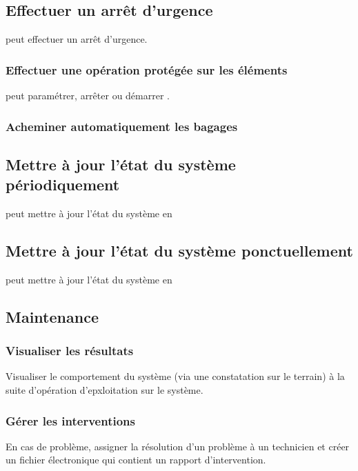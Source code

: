 \subsection{Effectuer un arrêt d'urgence}
 peut effectuer un arrêt d'urgence.

\subsubsection{Effectuer une opération protégée sur les éléments}
 peut paramétrer, arrêter ou démarrer .

\subsubsection{Acheminer automatiquement les bagages}

\subsection{Mettre à jour l'état du système périodiquement}
 peut mettre à jour l'état du système en 

\subsection{Mettre à jour l'état du système ponctuellement}
 peut mettre à jour l'état du système en 

\subsection{Maintenance}
\subsubsection{Visualiser les résultats}
Visualiser le comportement du système (via une constatation sur le terrain) à la suite d'opération d'epxloitation sur le système.

\subsubsection{Gérer les interventions}
En cas de problème, assigner la résolution d'un problème à un technicien et créer un fichier électronique qui contient un rapport d'intervention.

